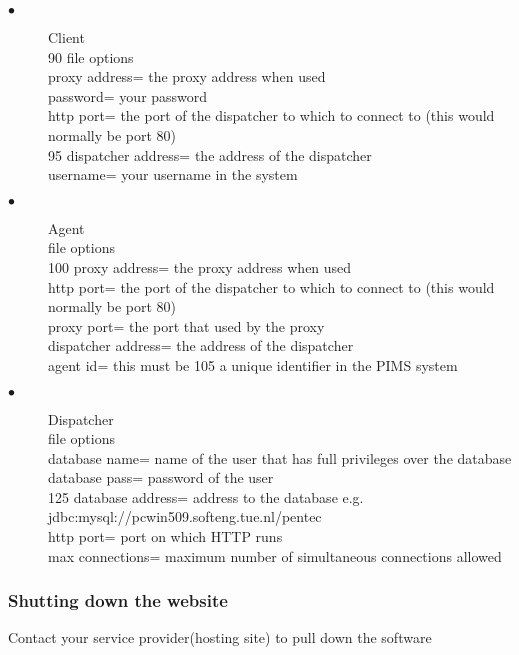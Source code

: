 \documentclass[a4paper]{article}
\begin{document}
\begin{description}
\item[$\bullet$]Client\\
90 file options\\
proxy address= the proxy address when used \\
password= your password \\
http port= the port of the dispatcher to which to connect to (this would normally be port
80) \\
95 dispatcher address= the address of the dispatcher \\
username= your username in the system \\


\item[$\bullet$]Agent\\
file options\\
100 proxy address= the proxy address when used \\
http port= the port of the dispatcher to which to connect to (this would normally be port
80) \\
proxy port= the port that used by the proxy \\
dispatcher address= the address of the dispatcher \\
agent id= this must be 105 a unique identifier in the PIMS system \\

\item[$\bullet$]Dispatcher\\
file options\\
database name= name of the user that has full privileges over the database \\
database pass= password of the user \\
125 database address= address to the database e.g. jdbc:mysql://pcwin509.softeng.tue.nl/pentec \\
http port= port on which HTTP runs \\
max connections= maximum number of simultaneous connections allowed \\

\end{description}

\subsubsection{Shutting down the website}
Contact your service provider(hosting site) to pull down the software
\end{document}
